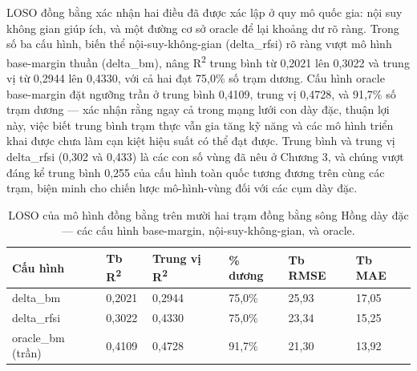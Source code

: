 LOSO đồng bằng xác nhận hai điều đã được xác lập ở quy mô quốc gia: nội suy không gian giúp ích, và một đường cơ sở oracle để lại khoảng dư rõ ràng. Trong số ba cấu hình, biến thể nội-suy-không-gian (delta\_rfsi) rõ ràng vượt mô hình base-margin thuần (delta\_bm), nâng R\textsuperscript{2} trung bình từ 0,2021 lên 0,3022 và trung vị từ 0,2944 lên 0,4330, với cả hai đạt 75,0\% số trạm dương. Cấu hình oracle base-margin đặt ngưỡng trần ở trung bình 0,4109, trung vị 0,4728, và 91,7\% số trạm dương --- xác nhận rằng ngay cả trong mạng lưới con dày đặc, thuận lợi này, việc biết trung bình trạm thực vẫn gia tăng kỹ năng và các mô hình triển khai được chưa làm cạn kiệt hiệu suất có thể đạt được. Trung bình và trung vị delta\_rfsi (0,302 và 0,433) là các con số vùng đã nêu ở Chương 3, và chúng vượt đáng kể trung bình 0,255 của cấu hình toàn quốc tương đương trên cùng các trạm, biện minh cho chiến lược mô-hình-vùng đối với các cụm dày đặc.

{\small
\begin{longtable}{llllll}
\caption{LOSO của mô hình đồng bằng trên mười hai trạm đồng bằng sông Hồng dày đặc --- các cấu hình base-margin, nội-suy-không-gian, và oracle.}\\
\toprule
\textbf{Cấu hình} & \textbf{Tb R\textsuperscript{2}} & \textbf{Trung vị R\textsuperscript{2}} & \textbf{\% dương} & \textbf{Tb RMSE} & \textbf{Tb MAE} \\
\midrule\endhead
delta\_bm & 0,2021 & 0,2944 & 75,0\% & 25,93 & 17,05 \\
delta\_rfsi & 0,3022 & 0,4330 & 75,0\% & 23,34 & 15,25 \\
oracle\_bm (trần) & 0,4109 & 0,4728 & 91,7\% & 21,30 & 13,92 \\
\bottomrule
\end{longtable}
}


